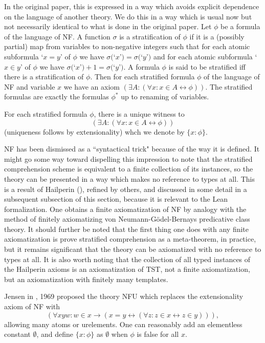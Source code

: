 \documentclass{article}
\theoremstyle{definition}
\theoremstyle{remark}
\begin{document}
In the original paper, this is expressed in a way which avoids explicit dependence on the language of another theory.  We do this in a way which is usual now but not necessarily identical to what is done in the original paper.  Let $\phi$ be a formula of the language of
NF.    A function $\sigma$ is a stratification of $\phi$ if it is a (possibly partial) map from variables to non-negative integers such that for each atomic subformula
`$x=y$'  of $\phi$ we have $\sigma($`$x$'$)=\sigma($`$y$'$)$ and for each atomic subformula `$x \in y$' of $\phi$ we have $\sigma($`$x$'$)+1 = \sigma($`$y$'$)$.
A formula $\phi$ is said to be stratified iff there is a stratification of $\phi$.  Then for each stratified formula $\phi$ of the language of NF and variable $x$ we have an axiom $(\exists A:(\forall x:x \in A \leftrightarrow \phi))$.  The stratified formulas are exactly the formulas $\phi^*$ up to renaming of variables.

For each stratified formula $\phi$, there is a unique witness to $$(\exists A:(\forall x:x \in A \leftrightarrow \phi))$$ (uniqueness follows by extensionality) whch we denote by $\{x:\phi\}$.

NF has been dismissed as a ``syntactical trick" because of the way it is defined.  It might go some way toward dispelling this impression to note that the stratified comprehension scheme is equivalent to a finite collection of its instances, so the theory can be presented in a way which makes no reference to types at all.  This is a result of Hailperin (\cite{hailperin}), refined by others, and discussed in some detail in a subsequent subsection of this section, because it is relevant to the Lean formalization.  One obtains a finite axiomatization of NF by analogy with the method of finitely axiomatizing von Neumann-G\"odel-Bernays predicative class theory.  It should further be noted that the first thing one does with any finite axiomatization is prove stratified comprehension as a meta-theorem, in practice, but it remains significant that the theory can be axiomatized with no reference to types at all.  It is also worth noting that the collection of all typed instances of the Hailperin axioms is an axiomatization of TST, not a finite axiomatization, but an axiomatization with finitely many templates.



Jensen in \cite{nfu}, 1969 proposed the theory NFU which replaces the extensionality axiom of NF with $$(\forall xyw:w \in x \rightarrow (x=y \leftrightarrow (\forall z:z \in x \leftrightarrow z\in y))),$$  allowing many atoms or urelements.  One can reasonably add an elementless constant $\emptyset$, and define $\{x:\phi\}$ as $\emptyset$ when $\phi$ is false for all $x$.
\end{document}
